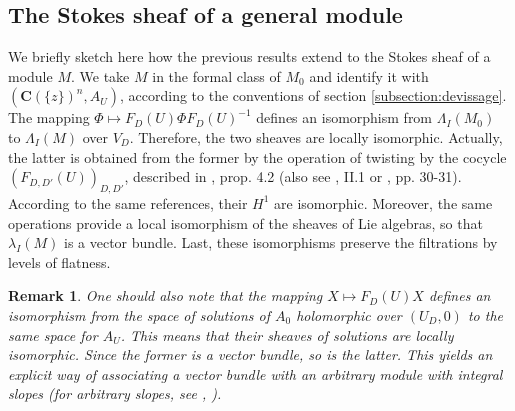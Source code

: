 \documentclass[english]{smfart}
\newtheorem{rmk}[thm]{Remark}
\numberwithin{equation}{thm}
\def\C{{\mathbf C}}
\def\Ka{{\C(\{z\})}}
\def\la{\lambda}
\def\La{\Lambda}
\begin{document}
\subsection{The Stokes sheaf of a general module}

We briefly sketch here how the previous results extend
to the Stokes sheaf of a module $M$. We take $M$ in
the formal class of $M_{0}$ and identify it with
$(\Ka^{n},A_{U})$, according to the conventions of
section \ref{subsection:devissage}. \\

The mapping $\Phi \mapsto F_{D}(U) \Phi F_{D}(U)^{-1}$
defines an isomorphism from $\La_{I}(M_{0})$ to 
$\La_{I}(M)$ over $V_{D}$. Therefore, the two sheaves
are locally isomorphic. Actually, the latter is obtained
from the former by the operation of twisting by the
cocycle $(F_{D,D'}(U))_{D,D'}$, described in \cite{Frenkel},
prop. 4.2 (also see \cite{BV}, II.1 or \cite{Varadarajan}, 
pp. 30-31). According to the same references, their $H^{1}$
are isomorphic. Moreover, the same operations provide a local
isomorphism of the sheaves of Lie algebras, so that $\la_{I}(M)$
is a vector bundle. Last, these isomorphisms preserve the
filtrations by levels of flatness. \\

\begin{rmk} \label{rmk:vector-bundle}
One should also note that the mapping $X \mapsto F_{D}(U) X$
defines an isomorphism from the space of solutions of $A_{0}$
holomorphic over $(U_{D},0)$ to the same space for $A_{U}$.
This means that their sheaves of solutions are locally isomorphic.
Since the former is a vector bundle, so is the latter. This yields
an explicit way of associating a vector bundle with an arbitrary
module with integral slopes (for arbitrary slopes, see \cite{JSIRR},
\cite{JSISOMONO}).
\end{rmk}


\end{document}
